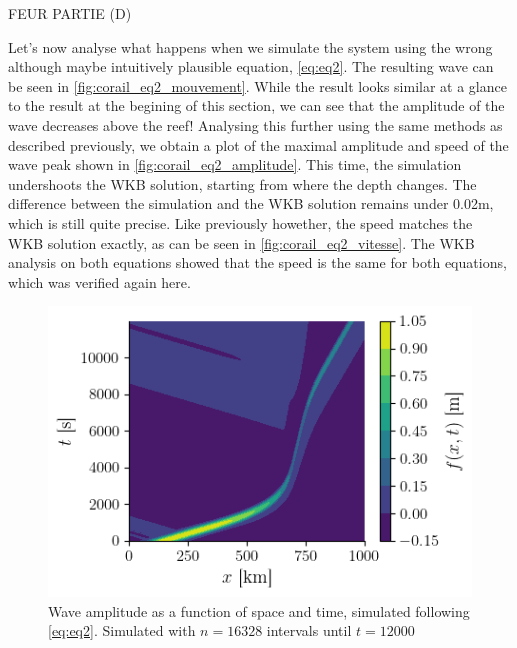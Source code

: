 FEUR PARTIE (D)

Let's now analyse what happens when we simulate the system using the wrong although maybe intuitively plausible equation, \autoref{eq:eq2}. The resulting wave can be seen in \autoref{fig:corail_eq2_mouvement}. While the result looks similar at a glance to the result at the begining of this section, we can see that the amplitude of the wave decreases above the reef! Analysing this further using the same methods as described previously, we obtain a plot of the maximal amplitude and speed of the wave peak shown in \autoref{fig:corail_eq2_amplitude}. This time, the simulation undershoots the WKB solution, starting from where the depth changes. The difference between the simulation and the WKB solution remains under 0.02m, which is still quite precise. Like previously howether, the speed matches the WKB solution exactly, as can be seen in \autoref{fig:corail_eq2_vitesse}. The WKB analysis on both equations showed that the speed is the same for both equations, which was verified again here.

\begin{figure}[h]
    \centering
    \includegraphics[width=0.6\linewidth]{figures/corail_eq2_mouvement_vague.png}
    \caption{Wave amplitude as a function of space and time, simulated following \autoref{eq:eq2}. Simulated with \(n=16328\) intervals until \(t=12000\)}
    \label{fig:corail_eq2_mouvement}
\end{figure}

